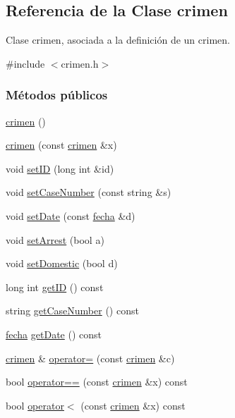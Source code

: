 \hypertarget{classcrimen}{\subsection{Referencia de la Clase crimen}
\label{classcrimen}
}


Clase crimen, asociada a la definición de un crimen.  




{\ttfamily \#include $<$crimen.\+h$>$}

\subsubsection*{Métodos públicos}
\begin{DoxyCompactItemize}
\item 
\hyperlink{classcrimen_ab1147e36869c7e635699e4ef746a7555}{crimen} ()
\item 
\hyperlink{classcrimen_a50b783e821c2f5bc829eceb9048c12d7}{crimen} (const \hyperlink{classcrimen}{crimen} \&x)
\item 
void \hyperlink{classcrimen_a2675734f5049f41b5fb5dbc4778df7f8}{set\+I\+D} (long int \&id)
\item 
void \hyperlink{classcrimen_a98ee8c42a0ec09c704c5f17e812a6bd5}{set\+Case\+Number} (const string \&s)
\item 
void \hyperlink{classcrimen_ac308c139bb8b599a7badbecd91bfbc5a}{set\+Date} (const \hyperlink{classfecha}{fecha} \&d)
\item 
void \hyperlink{classcrimen_ae08b85470038469179a01ba753b7641a}{set\+Arrest} (bool a)
\item 
void \hyperlink{classcrimen_a3ec14cf4bb0464350d8efd98d2679d41}{set\+Domestic} (bool d)
\item 
long int \hyperlink{classcrimen_a855eab30a304a6498828cb5d85a4e0e3}{get\+I\+D} () const 
\item 
string \hyperlink{classcrimen_ab3c025eb20cdcea9192ee190fa2af015}{get\+Case\+Number} () const 
\item 
\hyperlink{classfecha}{fecha} \hyperlink{classcrimen_a8a6712e536211034819441ab87e1c215}{get\+Date} () const 
\item 
\hyperlink{classcrimen}{crimen} \& \hyperlink{classcrimen_a675f3a6e34bf43e20613a96b93cbb407}{operator=} (const \hyperlink{classcrimen}{crimen} \&c)
\item 
bool \hyperlink{classcrimen_aeced9ce4b7486123412975b8884d1ab7}{operator==} (const \hyperlink{classcrimen}{crimen} \&x) const 
\item 
bool \hyperlink{classcrimen_ac865fdb9712f2426d947b1b5546b50e5}{operator$<$} (const \hyperlink{classcrimen}{crimen} \&x) const 
\end{DoxyCompactItemize}
